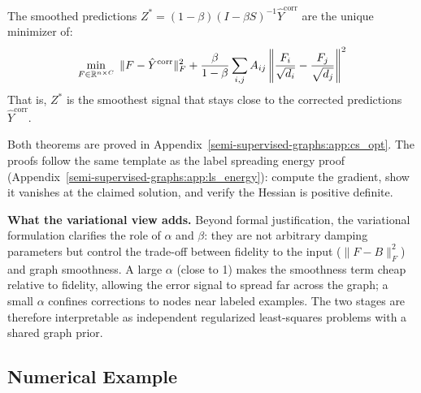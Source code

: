 \begin{notechapter}
\begin{theorem}
\label{semi-supervised-graphs:thm:cs_smooth_opt}
The smoothed predictions $Z^* = (1-\beta)(I - \beta S)^{-1}\hat{Y}^{\text{corr}}$
are the unique minimizer of:
\begin{equation}
\min_{F \in \mathbb{R}^{n \times C}}\; \|F - \hat{Y}^{\text{corr}}\|_F^2
  + \frac{\beta}{1-\beta}\sum_{i,j}A_{ij}
  \left\|\frac{F_i}{\sqrt{d_i}} - \frac{F_j}{\sqrt{d_j}}\right\|^2
\end{equation}
That is, $Z^*$ is the smoothest signal that stays close to the corrected
predictions $\hat{Y}^{\text{corr}}$.
\end{theorem}

Both theorems are proved in Appendix~\ref{semi-supervised-graphs:app:cs_opt}. The proofs follow the
same template as the label spreading energy proof
(Appendix~\ref{semi-supervised-graphs:app:ls_energy}): compute the gradient, show it vanishes at the
claimed solution, and verify the Hessian is positive definite.

\begin{insightbox}
\textbf{What the variational view adds.} Beyond formal justification, the
variational formulation clarifies the role of $\alpha$ and $\beta$: they are
not arbitrary damping parameters but control the trade-off between fidelity to
the input ($\|F - B\|_F^2$) and graph smoothness. A large $\alpha$ (close to
1) makes the smoothness term cheap relative to fidelity, allowing the error
signal to spread far across the graph; a small $\alpha$ confines corrections to
nodes near labeled examples. The two stages are therefore interpretable as
independent regularized least-squares problems with a shared graph prior.
\end{insightbox}

\subsection{Numerical Example}
\begin{figure}[ht]
\centering
{}
\end{figure}
\end{notechapter}
